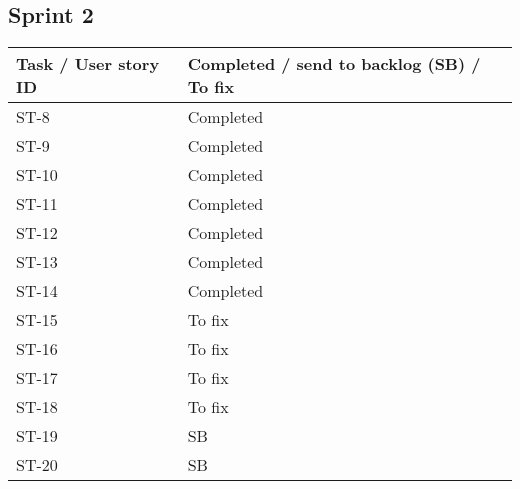 \documentclass[12pt]{article}
\begin{document}
\subsection{Sprint 2}
{
\centering
\begin{longtable}{| p{7cm} | p{7cm}|}
			\hline			
			\textbf{Task / User story ID} & \textbf{Completed / send to backlog (SB) / To fix }
			 \\ \hline  ST-8 & Completed \\ \hline
             \hline  ST-9 & Completed \\ \hline
             \hline  ST-10 & Completed \\ \hline
             \hline  ST-11 & Completed \\ \hline
             \hline  ST-12 & Completed \\ \hline
             \hline  ST-13 & Completed \\ \hline
             \hline  ST-14 & Completed \\ \hline
             \hline  ST-15 & To fix \\ \hline
             \hline  ST-16 & To fix \\ \hline 
             \hline  ST-17 & To fix \\ \hline
             \hline  ST-18 & To fix \\ \hline
             \hline  ST-19 & SB \\ \hline
             \hline  ST-20 & SB \\ \hline
\end{longtable}
}

\end{document}
